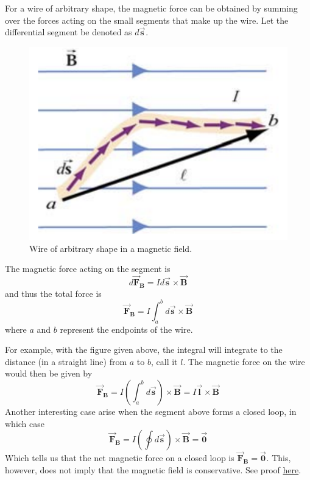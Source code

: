 \documentclass[11pt, letterpaper]{article}
\theoremstyle{definition}
\theoremstyle{remark}
\newcommand{\bv}[2][]{\bm{\vec{#2}_{#1}}}
\begin{document}
For a wire of arbitrary shape, the magnetic force can be obtained by summing over the forces acting on the small segments that make up the wire. Let the differential segment be denoted as $d\bv{s}$.
\begin{figure}[h!]
	\centering
	\includegraphics[scale=0.6]{arbitrary}
	\caption{Wire of arbitrary shape in a magnetic field.}
	\label{fig:arbitrary}
\end{figure}

The magnetic force acting on the segment is \[d\bv[B]{F} = Id\bv{s}\times\bv{B}\] and thus the total force is
\begin{equation}\label{eqn:arbitrary}
	\boxed{\bv[B]{F} = I\int_a^b d\bv{s}\times\bv{B}}
\end{equation}
where $a$ and $b$ represent the endpoints of the wire.

For example, with the figure given above, the integral will integrate to the distance (in a straight line) from $a$ to $b$, call it $l$. The magnetic force on the wire would then be given by \[\bv[B]{F} = I\left(\int_a^bd\bv{s}\right)\times\bv{B} = I\bv{l}\times\bv{B}\] Another interesting case arise when the segment above forms a closed loop, in which case \[\bv[B]{F} = I\left(\oint d\bv{s}\right)\times\bv{B} = \bv{0}\] Which tells us that the net magnetic force on a closed loop is $\bv[B]{F} = \bv{0}$. This, however, does not imply that the magnetic field is conservative. See proof \hyperref[subsec:non-conservative]{here}.
\end{document}
